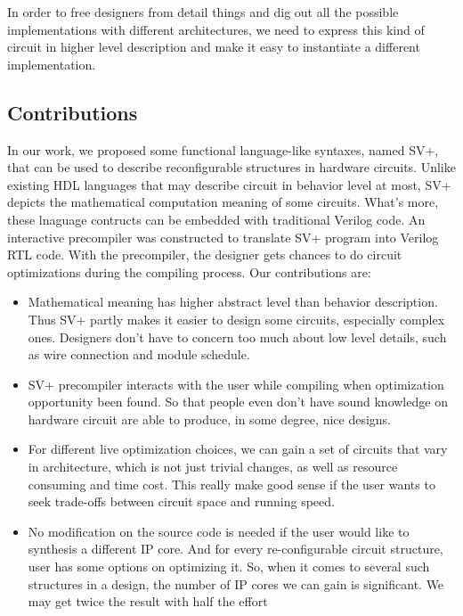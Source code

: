 In order to free designers from detail things and dig out all the possible implementations with different architectures, we need to express this kind of circuit in higher level description and make it easy to instantiate a different implementation.

\subsection{Contributions}
In our work, we proposed some functional language-like syntaxes, named SV+, that can be used to describe reconfigurable structures in hardware circuits. Unlike existing HDL languages that may describe circuit in behavior level at most, SV+ depicts the mathematical computation meaning of some circuits. What's more, these lnaguage contructs can be embedded with traditional Verilog code. An interactive precompiler was constructed to translate SV+ program into Verilog RTL code. With the precompiler, the designer gets chances to do circuit optimizations during the compiling process. Our contributions are:

\begin{itemize}
    \item Mathematical meaning has higher abstract level than behavior description. 
          Thus SV+ partly makes it easier to design some circuits, especially 
          complex ones. Designers don't have to concern too much about low level details, such as 
          wire connection and module schedule.
    \item SV+ precompiler interacts with the user while compiling when optimization opportunity
          been found. So that people even don't have sound knowledge on hardware circuit are 
          able to produce, in some degree, nice designs. 
    \item For different live optimization choices, we can gain a set of circuits that vary in 
          architecture, which is not just trivial changes, as well as resource consuming and 
          time cost. This really make good sense if the user wants to seek trade-offs between 
          circuit space and running speed. 
    \item No modification on the source code is needed if the user would like to synthesis a
          different IP core. And for every re-configurable circuit structure, user has some 
          options on optimizing it. So, when it comes to several such structures in a design, the number 
          of IP cores we can gain is significant. We may get twice the result with half the effort
\end{itemize}

